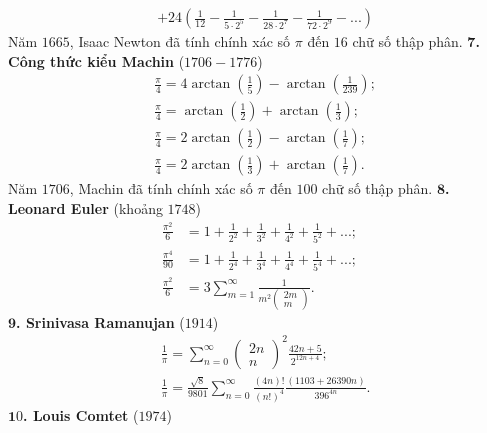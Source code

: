 \begin{multicols}{2}
\begin{align*}
		&+\! 24\left(\!\! {\frac{1}{{12}} \!-\! \frac{1}{{5 \!\cdot\! {2^5}}} \!-\! \frac{1}{{28 \!\cdot\! {2^7}}} \!-\! \frac{1}{{72 \!\cdot\! {2^9}}} \!-\! ...}\! \right)
	\end{align*}
	Năm $1665$, Isaac Newton đã tính chính xác số $\pi$ đến $16$ chữ số thập phân.
	\vskip 0.1cm
	$\pmb7$\textbf{\color{lichsutoanhoc}. Công thức kiểu Machin} ($1706-1776$)
	\begin{align*}
		&\frac{\pi }{4} = 4\arctan \left( {\frac{1}{5}} \right) - \arctan \left( {\frac{1}{{239}}} \right);\\
		&\frac{\pi }{4} = \arctan \left( {\frac{1}{2}} \right) + \arctan \left( {\frac{1}{3}} \right);\\
		&\frac{\pi }{4} = 2\arctan \left( {\frac{1}{2}} \right) - \arctan \left( {\frac{1}{7}} \right);\\
		&\frac{\pi }{4} = 2\arctan \left( {\frac{1}{3}} \right) + \arctan \left( {\frac{1}{7}} \right).
	\end{align*}
	Năm $1706$, Machin đã tính chính xác số $\pi$  đến $100$ chữ số thập phân.
	\vskip 0.1cm
	$\pmb8$\textbf{\color{lichsutoanhoc}. Leonard Euler} (khoảng $1748$)
	\begin{align*}
		\frac{{{\pi ^2}}}{6} &= 1 + \frac{1}{{{2^2}}} + \frac{1}{{{3^2}}} + \frac{1}{{{4^2}}} + \frac{1}{{{5^2}}} + ...;\\
		\frac{{{\pi ^4}}}{{90}} &= 1 + \frac{1}{{{2^4}}} + \frac{1}{{{3^4}}} + \frac{1}{{{4^4}}} + \frac{1}{{{5^4}}} + ...;\\
		\frac{{{\pi ^2}}}{6} &= 3\sum\limits_{m = 1}^\infty  {\frac{1}{{{m^2}\left( \begin{array}{l}
						2m\\
						m
					\end{array} \right)}}} .
	\end{align*}
	$\pmb9$\textbf{\color{lichsutoanhoc}. Srinivasa Ramanujan} ($1914$)
	\begin{align*}
		&\frac{1}{\pi } = {\sum\limits_{n = 0}^\infty  {\left( \begin{array}{l}
					2n\\
					n
				\end{array} \right)} ^2}\frac{{42n + 5}}{{{2^{12n + 4}}}};\\
		&\frac{1}{\pi } = \frac{{\sqrt 8 }}{{9801}}\sum\limits_{n = 0}^\infty  {\frac{{\left( {4n} \right)!}}{{{{\left( {n!} \right)}^4}}}} \frac{{\left( {1103 + 26390n} \right)}}{{{{396}^{4n}}}}.
	\end{align*}
	$\pmb10$\textbf{\color{lichsutoanhoc}. Louis Comtet} ($1974$)

\end{multicols}
